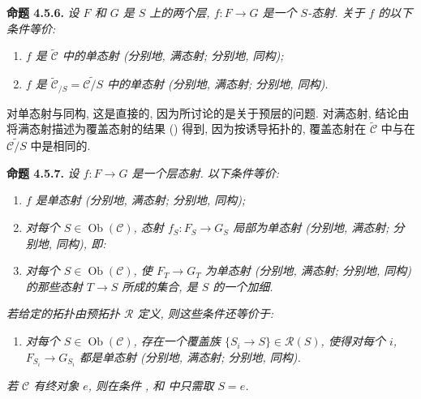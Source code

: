 
\medskip
\noindent{}\textbf{命题 4.5.6.}
\textit{设 \(F\) 和 \(G\) 是 \(S\) 上的两个层,
\(f:F\to G\) 是一个 \(S\)-态射.
关于 \(f\) 的以下条件等价:}
\begin{enumerate}
  \item[(i)]
  \textit{\(f\) 是 \(\widetilde{\mathscr C}\) 中的单态射
  (分别地, 满态射; 分别地, 同构);}
  \item[(ii)]
  \textit{\(f\) 是 \(\widetilde{\mathscr C}_{/S}=\widetilde{\mathscr C/S}\)
  中的单态射 (分别地, 满态射; 分别地, 同构).}
\end{enumerate}

对单态射与同构, 这是直接的, 因为所讨论的是关于预层的问题.
对满态射, 结论由将满态射描述为覆盖态射的结果
() 得到,
因为按诱导拓扑的,
覆盖态射在 \(\widetilde{\mathscr C}\) 中与在
\(\widetilde{\mathscr C/S}\) 中是相同的.

\medskip
\noindent{}\textbf{命题 4.5.7.}
\textit{设 \(f:F\to G\) 是一个层态射. 以下条件等价:}
\begin{enumerate}
  \item[(i)]
  \textit{\(f\) 是单态射 (分别地, 满态射; 分别地, 同构);}
  \item[(ii)]
  \textit{对每个 \(S\in\operatorname{Ob}(\mathscr C)\), 态射
  \(f_S:F_S\to G_S\) 局部为单态射
  (分别地, 满态射; 分别地, 同构), 即:}
  \item[(iii)]
  \textit{对每个 \(S\in\operatorname{Ob}(\mathscr C)\),
  使 \(F_T\to G_T\) 为单态射 (分别地, 满态射; 分别地, 同构)
  的那些态射 \(T\to S\) 所成的集合, 是 \(S\) 的一个加细.}
\end{enumerate}
\textit{若给定的拓扑由预拓扑 \(\mathscr R\) 定义,
则这些条件还等价于:}
\begin{enumerate}
  \item[(iv)]
  \textit{对每个 \(S\in\operatorname{Ob}(\mathscr C)\), 存在一个覆盖族
  \(\{S_i\to S\}\in\mathscr R(S)\),
  使得对每个 \(i\), \(F_{S_i}\to G_{S_i}\) 都是单态射
  (分别地, 满态射; 分别地, 同构).}
\end{enumerate}
\textit{若 \(\mathscr C\) 有终对象 \(e\),
则在条件 ,
 和
 中只需取 \(S=e\).}

